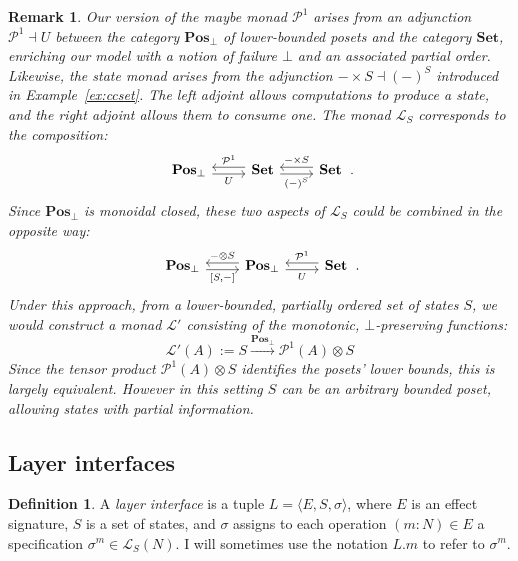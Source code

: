 \documentclass[11pt,oneside,draft]{book}
\newtheorem{remark}[theorem]{Remark}
\theoremstyle{definition}
\newtheorem{definition}[theorem]{Definition}
\begin{document}
\begin{remark}
Our version of the \emph{maybe} monad $\mathcal{P}^1$
arises from an adjunction $\mathcal{P}^1 \dashv U$
between the category $\mathbf{Pos}_\bot$
of lower-bounded posets
and the category $\mathbf{Set}$,
enriching our model with a notion of failure $\bot$
and an associated partial order.
Likewise,
the state monad arises from the adjunction
$- \times S \dashv (-)^S$
introduced in Example~\ref{ex:ccset}.
The left adjoint allows computations to produce a state,
and the right adjoint allows them to consume one.
The monad $\mathcal{L}_S$ corresponds to the composition:
\[
  \begin{tikzcd}
    \mathbf{Pos}_\bot
      \ar[r, "U"', shift right] &
    \mathbf{Set}
      \ar[l, "\mathcal{P}^1"', shift right]
      \ar[r, "(-)^S"', shift right] &
    \mathbf{Set}
      \ar[l, "- \times S"', shift right]
   \end{tikzcd}
  \,.
\]
Since $\mathbf{Pos}_\bot$ is monoidal closed,
these two aspects of $\mathcal{L}_S$
could be combined in the opposite way:
\[
  \begin{tikzcd}
    \mathbf{Pos}_\bot
      \ar[r, "{[S, {-}]}"', shift right] &
    \mathbf{Pos}_\bot
      \ar[l, "{-} \otimes S"', shift right]
      \ar[r, "U"', shift right] &
    \mathbf{Set}
      \ar[l, "\mathcal{P}^1"', shift right]
   \end{tikzcd}
  \,.
\]
Under this approach,
from a \emph{lower-bounded, partially ordered}
set of states $S$, we would construct a monad $\mathcal{L}'$
consisting of the \emph{monotonic, $\bot$-preserving} functions:
\[
  \mathcal{L}'(A) := S \xrightarrow{\mathbf{Pos}_\bot} \mathcal{P}^1(A) \otimes S
\]
Since the tensor product $\mathcal{P}^1(A) \otimes S$ identifies
the posets' lower bounds,
this is largely equivalent.
However in this setting $S$ can be an arbitrary bounded poset,
allowing states with partial information.
\end{remark}


\subsection{Layer interfaces} %

\begin{definition} %
A \emph{layer interface} is a tuple
$L = \langle E, S, \sigma \rangle$,
where $E$ is an effect signature,
$S$ is a set of states,
and $\sigma$ assigns to each operation
$(m \mathbin: N) \in E$
a specification
$\sigma^m \in \mathcal{L}_S(N)$.
I will sometimes use the notation $L.m$
to refer to $\sigma^m$.
\end{definition}
\end{document}
